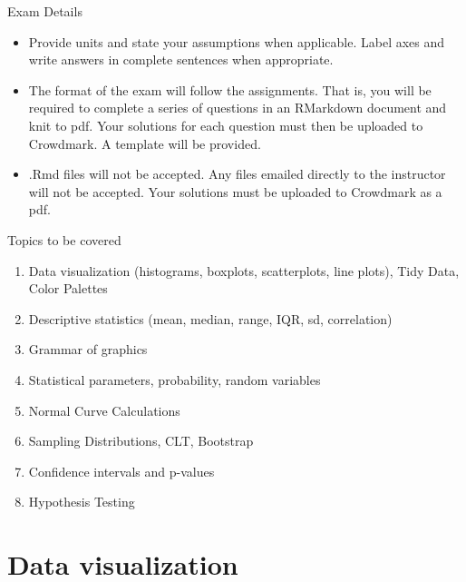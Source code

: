 \documentclass[10pt,handout]{beamer}\usepackage[]{graphicx}\usepackage[]{color}
\begin{document}
\begin{frame}{Exam Details}
	
	\begin{itemize}
		\setlength\itemsep{.51em}
		
		\item Provide units and state your assumptions when applicable. Label axes and write answers in complete sentences when appropriate.

\item The format of the exam will follow the assignments. That is, you will be required to complete a series of questions in an RMarkdown document and knit to pdf. Your solutions for each question must then be uploaded to Crowdmark. A template will be provided. 

\item .Rmd files will not be accepted. Any files emailed directly to the instructor will not be accepted. Your solutions must be uploaded to Crowdmark as a pdf. 
		
	\end{itemize}
	
\end{frame}


\begin{frame}{Topics to be covered}
	
	\begin{enumerate}
		\setlength\itemsep{.51em}
		\item Data visualization (histograms, boxplots, scatterplots, line plots), Tidy Data, Color Palettes
		\item Descriptive statistics (mean, median, range, IQR, sd, correlation)
		\item Grammar of graphics
		\item Statistical parameters, probability, random variables
		\item Normal Curve Calculations
		\item Sampling Distributions, CLT, Bootstrap
		\item Confidence intervals and p-values
		\item Hypothesis Testing
	\end{enumerate}
	
\end{frame}

\section{Data visualization}
\end{document}

